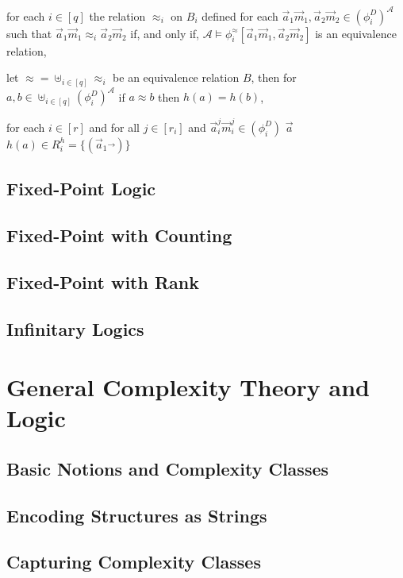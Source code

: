 \documentclass[../main/thesis.tex]{subfiles}
\begin{document}
\begin{definition}
  \begin{myenum}
  \item for each $i \in [q]$ the relation $\approx_i$ on $B_i$ defined for each
    $\vec{a}_1\vec{m}_1, \vec{a}_2\vec{m}_2 \in (\phi^D_i)^{\mathcal{A}}$ such
    that $\vec{a}_1\vec{m}_1 \approx_i \vec{a}_2\vec{m}_2$ if, and only if,
    $\mathcal{A} \models \phi^{\approx}_i[\vec{a}_1\vec{m}_1,
    \vec{a}_2\vec{m}_2]$ is an equivalence relation,
  \item let $\approx = \uplus_{i \in [q]}\approx_i$ be an equivalence relation
    $B$, then for $a , b \in \uplus_{i \in [q]}(\phi^D_i)^{\mathcal{A}}$ if $a
    \approx b$ then $h(a) = h(b)$,
  \item for each $i \in [r]$ and for all $j \in [r_i]$ and
    $\vec{a}^j_i\vec{m}^j_i \in (\phi^D_i)$ $\vec{a}$$h(a) \in R^h_i =
    \{(\vec{a}_1\vec{})\}$
  \end{myenum}
\end{definition}

\subsection{Fixed-Point Logic}
\subsection{Fixed-Point with Counting}
\subsection{Fixed-Point with Rank}
\subsection{Infinitary Logics}

\section{General Complexity Theory and Logic}
\subsection{Basic Notions and Complexity Classes}
\subsection{Encoding Structures as Strings}
\subsection{Capturing Complexity Classes}
\end{document}
